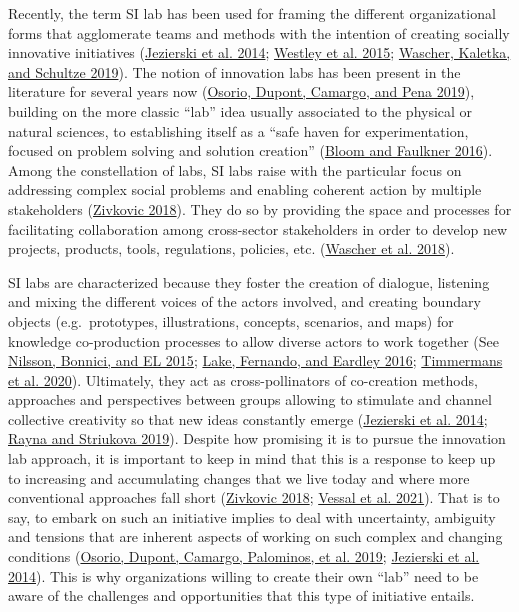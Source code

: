 \documentclass[AMA,STIX1COL,APA,STIX2COL]{WileyNJD-v2}
\begin{document}
Recently, the term SI lab has been used for framing the different
organizational forms that agglomerate teams and methods with the
intention of creating socially innovative initiatives
(\protect\hyperlink{ref-Jezierski2014}{Jezierski et al. 2014};
\protect\hyperlink{ref-Westley2015}{Westley et al. 2015};
\protect\hyperlink{ref-Wascher2019}{Wascher, Kaletka, and Schultze
2019}). The notion of innovation labs has been present in the literature
for several years now (\protect\hyperlink{ref-Osorio2019-A}{Osorio,
Dupont, Camargo, and Pena 2019}), building on the more classic ``lab''
idea usually associated to the physical or natural sciences, to
establishing itself as a ``safe haven for experimentation, focused on
problem solving and solution creation''
(\protect\hyperlink{ref-Bloom2016}{Bloom and Faulkner 2016}). Among the
constellation of labs, SI labs raise with the particular focus on
addressing complex social problems and enabling coherent action by
multiple stakeholders (\protect\hyperlink{ref-Zivkovic2018}{Zivkovic
2018}). They do so by providing the space and processes for facilitating
collaboration among cross-sector stakeholders in order to develop new
projects, products, tools, regulations, policies, etc.
(\protect\hyperlink{ref-Wascher2018}{Wascher et al. 2018}).

SI labs are characterized because they foster the creation of dialogue,
listening and mixing the different voices of the actors involved, and
creating boundary objects (e.g.~prototypes, illustrations, concepts,
scenarios, and maps) for knowledge co-production processes to allow
diverse actors to work together (See
\protect\hyperlink{ref-Nilsson2015}{Nilsson, Bonnici, and EL 2015};
\protect\hyperlink{ref-Lake2016}{Lake, Fernando, and Eardley 2016};
\protect\hyperlink{ref-Timmermans2020}{Timmermans et al. 2020}).
Ultimately, they act as cross-pollinators of co-creation methods,
approaches and perspectives between groups allowing to stimulate and
channel collective creativity so that new ideas constantly emerge
(\protect\hyperlink{ref-Jezierski2014}{Jezierski et al. 2014};
\protect\hyperlink{ref-Rayna2019}{Rayna and Striukova 2019}). Despite
how promising it is to pursue the innovation lab approach, it is
important to keep in mind that this is a response to keep up to
increasing and accumulating changes that we live today and where more
conventional approaches fall short
(\protect\hyperlink{ref-Zivkovic2018}{Zivkovic 2018};
\protect\hyperlink{ref-RezaeeVessal2021}{Vessal et al. 2021}). That is
to say, to embark on such an initiative implies to deal with
uncertainty, ambiguity and tensions that are inherent aspects of working
on such complex and changing conditions
(\protect\hyperlink{ref-Osorio2019}{Osorio, Dupont, Camargo, Palominos,
et al. 2019}; \protect\hyperlink{ref-Jezierski2014}{Jezierski et al.
2014}). This is why organizations willing to create their own ``lab''
need to be aware of the challenges and opportunities that this type of
initiative entails.
\end{document}

